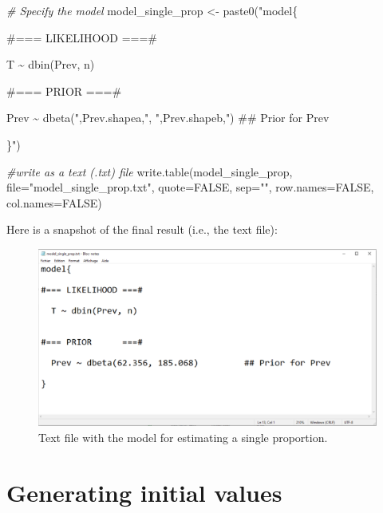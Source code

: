\documentclass[
]{book}
\newenvironment{Shaded}{\begin{snugshade}}{\end{snugshade}}
\newcommand{\AttributeTok}[1]{\textcolor[rgb]{0.77,0.63,0.00}{#1}}
\newcommand{\CommentTok}[1]{\textcolor[rgb]{0.56,0.35,0.01}{\textit{#1}}}
\newcommand{\ConstantTok}[1]{\textcolor[rgb]{0.00,0.00,0.00}{#1}}
\newcommand{\FunctionTok}[1]{\textcolor[rgb]{0.00,0.00,0.00}{#1}}
\newcommand{\NormalTok}[1]{#1}
\newcommand{\OtherTok}[1]{\textcolor[rgb]{0.56,0.35,0.01}{#1}}
\newcommand{\StringTok}[1]{\textcolor[rgb]{0.31,0.60,0.02}{#1}}
\begin{document}
\begin{Shaded}
\begin{Highlighting}[]
\CommentTok{\# Specify the model}
\NormalTok{model\_single\_prop }\OtherTok{\textless{}{-}} \FunctionTok{paste0}\NormalTok{(}\StringTok{"model\{}

\StringTok{\#=== LIKELIHOOD ===\#}

\StringTok{  T \textasciitilde{} dbin(Prev, n)}


\StringTok{\#=== PRIOR  ===\#}

\StringTok{  Prev \textasciitilde{} dbeta("}\NormalTok{,Prev.shapea,}\StringTok{", "}\NormalTok{,Prev.shapeb,}\StringTok{")    \#\# Prior for Prev}

\StringTok{\}"}\NormalTok{)}

\CommentTok{\#write as a text (.txt) file}
\FunctionTok{write.table}\NormalTok{(model\_single\_prop, }
            \AttributeTok{file=}\StringTok{"model\_single\_prop.txt"}\NormalTok{, }
            \AttributeTok{quote=}\ConstantTok{FALSE}\NormalTok{, }
            \AttributeTok{sep=}\StringTok{""}\NormalTok{, }
            \AttributeTok{row.names=}\ConstantTok{FALSE}\NormalTok{,}
             \AttributeTok{col.names=}\ConstantTok{FALSE}\NormalTok{)}
\end{Highlighting}
\end{Shaded}

Here is a snapshot of the final result (i.e., the text file):

\begin{figure}
\centering
\includegraphics{Figures/Model_single_prop.png}
\caption{Text file with the model for estimating a single proportion.}
\end{figure}

\hypertarget{generating-initial-values}{%
\section{Generating initial values}\label{generating-initial-values}}
\end{document}
